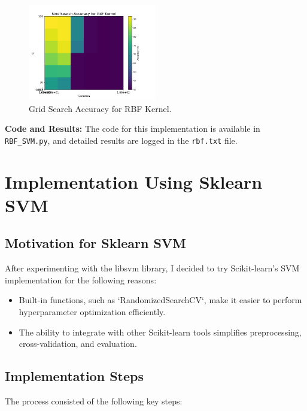 \documentclass[lettersize,journal]{IEEEtran}
\begin{document}
\begin{figure}[H]
    \centering
    \includegraphics[width=0.5\textwidth]{grid_search_rbf_2_classes_with_pca_60000.png}
    \caption{Grid Search Accuracy for RBF Kernel.}
    \label{fig:grid-search-rbf}
\end{figure}

\vspace{0.5cm}

\textbf{Code and Results:}  
The code for this implementation is available in \texttt{RBF\_SVM.py}, and detailed results are logged in the \texttt{rbf.txt} file.

\section{\textbf{Implementation Using Sklearn SVM}}

\subsection{\textbf{Motivation for Sklearn SVM}}
After experimenting with the libsvm library, I decided to try Scikit-learn's SVM implementation for the following reasons:
\begin{itemize}
    \item Built-in functions, such as `RandomizedSearchCV`, make it easier to perform hyperparameter optimization efficiently.
    \item The ability to integrate with other Scikit-learn tools simplifies preprocessing, cross-validation, and evaluation.
\end{itemize}

\subsection{\textbf{Implementation Steps}}
The process consisted of the following key steps:
\end{document}
